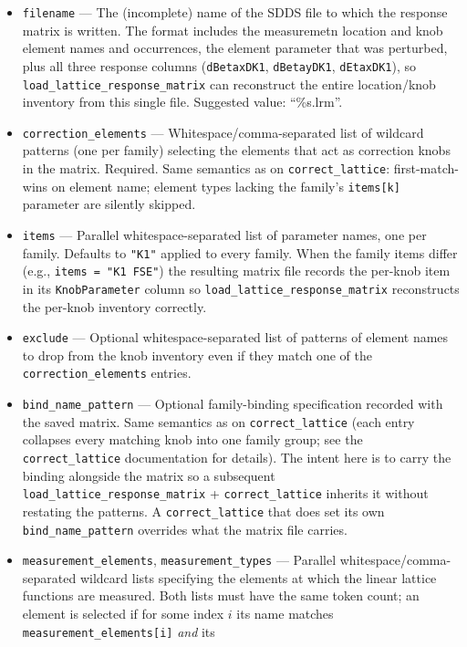 \documentclass[11pt]{article}
\begin{document}
\begin{itemize}
\item \verb|filename| --- The (incomplete) name of the SDDS file to which the
  response matrix is written.  The format includes the measuremetn location and knob element names
  and occurrences, the element parameter that was perturbed, plus all three
  response columns (\verb|dBetaxDK1|, \verb|dBetayDK1|, \verb|dEtaxDK1|),
  so \verb|load_lattice_response_matrix| can reconstruct the entire
  location/knob inventory from this single file.  Suggested value: ``\%s.lrm''.
\item \verb|correction_elements| --- Whitespace/comma-separated list of
  wildcard patterns (one per family) selecting the elements that act as
  correction knobs in the matrix.  Required.  Same semantics as on
  \verb|correct_lattice|: first-match-wins on element name; element types
  lacking the family's \verb|items[k]| parameter are silently skipped.
\item \verb|items| --- Parallel whitespace-separated list of parameter names,
  one per family.  Defaults to \verb|"K1"| applied to every family.  When the
  family items differ (e.g., \verb|items = "K1 FSE"|) the resulting matrix
  file records the per-knob item in its \verb|KnobParameter| column so
  \verb|load_lattice_response_matrix| reconstructs the per-knob inventory
  correctly.
\item \verb|exclude| --- Optional whitespace-separated list of patterns of
  element names to drop from the knob inventory even if they match one of
  the \verb|correction_elements| entries.
\item \verb|bind_name_pattern| --- Optional family-binding specification
  recorded with the saved matrix.  Same semantics as on \verb|correct_lattice|
  (each entry collapses every matching knob into one family group; see the
  \verb|correct_lattice| documentation for details).  The intent here is
  to carry the binding alongside the matrix so a subsequent
  \verb|load_lattice_response_matrix| + \verb|correct_lattice| inherits it
  without restating the patterns.  A \verb|correct_lattice| that does
  set its own \verb|bind_name_pattern| overrides what the matrix file
  carries.
\item \verb|measurement_elements|, \verb|measurement_types| --- Parallel
  whitespace/comma-separated wildcard lists specifying the elements at
  which the linear lattice functions are measured.  Both lists must
  have the same token count; an element is selected if for some index
  $i$ its name matches \verb|measurement_elements[i]| {\em and} its

\end{itemize}
\end{document}
